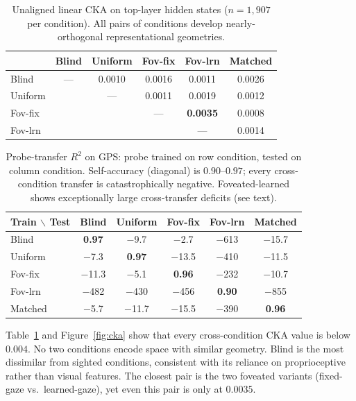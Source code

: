 \documentclass[10pt,conference,compsocconf]{IEEEtran}
\begin{document}
\begin{table}[t]
\centering
\caption{Unaligned linear CKA on top-layer hidden states ($n=1{,}907$ per condition). All pairs of conditions develop nearly-orthogonal representational geometries.}
\label{tab:cka}
\begin{tabular}{lccccc}
\toprule
 & Blind & Uniform & Fov-fix & Fov-lrn & Matched \\
\midrule
Blind    & ---   & 0.0010 & 0.0016 & 0.0011 & 0.0026 \\
Uniform  &       & ---    & 0.0011 & 0.0019 & 0.0012 \\
Fov-fix  &       &        & ---    & \textbf{0.0035} & 0.0008 \\
Fov-lrn  &       &        &        & ---    & 0.0014 \\
\bottomrule
\end{tabular}
\end{table}

\begin{table}[t]
\centering
\caption{Probe-transfer $R^2$ on GPS: probe trained on row condition, tested on column condition. Self-accuracy (diagonal) is $0.90$--$0.97$; every cross-condition transfer is catastrophically negative. Foveated-learned shows exceptionally large cross-transfer deficits (see text).}
\label{tab:transfer}
\begin{tabular}{lccccc}
\toprule
Train $\backslash$ Test & Blind & Uniform & Fov-fix & Fov-lrn & Matched \\
\midrule
Blind    & \textbf{0.97} & $-$9.7   & $-$2.7   & $-$613   & $-$15.7 \\
Uniform  & $-$7.3        & \textbf{0.97} & $-$13.5 & $-$410  & $-$11.5 \\
Fov-fix  & $-$11.3       & $-$5.1   & \textbf{0.96} & $-$232  & $-$10.7 \\
Fov-lrn  & $-$482        & $-$430   & $-$456   & \textbf{0.90} & $-$855 \\
Matched  & $-$5.7        & $-$11.7  & $-$15.5  & $-$390   & \textbf{0.96} \\
\bottomrule
\end{tabular}
\end{table}

Table~\ref{tab:cka} and Figure~\ref{fig:cka} show that every cross-condition CKA value is below $0.004$. No two conditions encode space with similar geometry. Blind is the most dissimilar from sighted conditions, consistent with its reliance on proprioceptive rather than visual features. The closest pair is the two foveated variants (fixed-gaze vs.\ learned-gaze), yet even this pair is only at $0.0035$.
\end{document}
